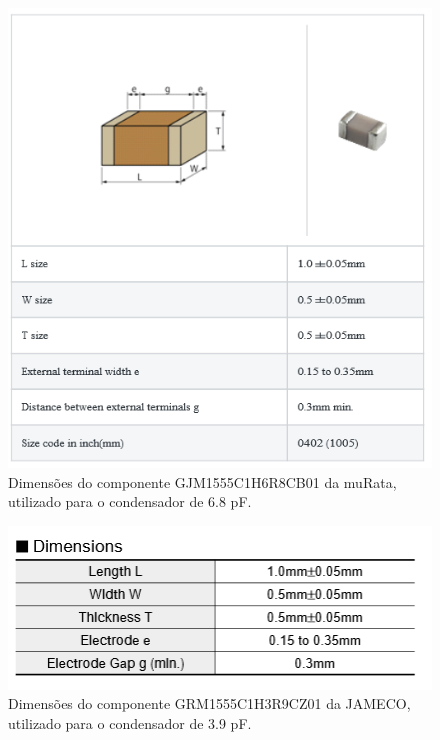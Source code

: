 \documentclass[11pt]{article}
\numberwithin{equation}{section}
\begin{document}
\begin{figure}[H]
\centering
\includegraphics[keepaspectratio=true, scale=0.45]{teoricas/6_8pF}
\vspace{-0.5em}
\caption{Dimensões do componente GJM1555C1H6R8CB01 da muRata, utilizado para o condensador de 6.8 pF.}
\vspace{-0.8em}
\label{fig:C_6_8}
\end{figure}

\begin{figure}[H]
\centering
\includegraphics[keepaspectratio=true, scale=0.45]{teoricas/3_9pF}
\vspace{-0.5em}
\caption{Dimensões do componente GRM1555C1H3R9CZ01 da JAMECO, utilizado para o condensador de 3.9 pF.}
\vspace{-0.8em}
\label{fig:C_3_9}
\end{figure}
\end{document}
